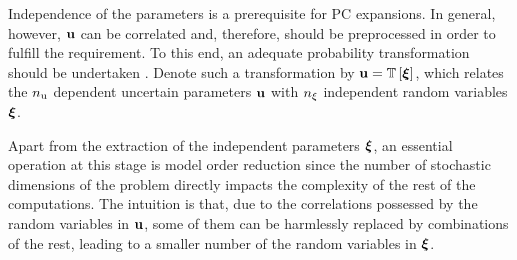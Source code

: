 Independence of the parameters is a prerequisite for PC expansions. In general,
however, $\mathbf{u}$ can be correlated and, therefore, should be preprocessed in order
to fulfill the requirement. To this end, an adequate probability transformation
should be undertaken \cite{eldred2008}. Denote such a transformation by $\vU =
\oTransform{\vZ}$, which relates the ${n_\text{u}}$ dependent uncertain parameters
$\mathbf{u}$ with ${n_\xi}$ independent random variables $\boldsymbol{\xi}$.

Apart from the extraction of the independent parameters $\boldsymbol{\xi}$, an essential
operation at this stage is model order reduction since the number of stochastic
dimensions of the problem directly impacts the complexity of the rest of the
computations. The intuition is that, due to the correlations possessed by the
random variables in $\mathbf{u}$, some of them can be harmlessly replaced by
combinations of the rest, leading to a smaller number of the random variables in
$\boldsymbol{\xi}$.
